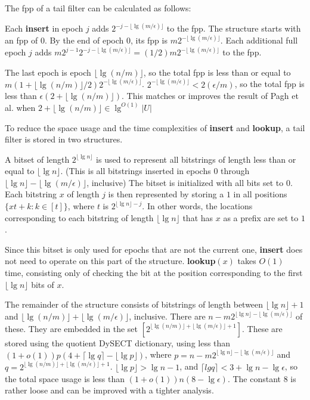 \documentclass[letterpaper]{article}
\begin{document}
The fpp of a tail filter can be calculated as follows:

Each {\bf insert} in epoch $j$ adds $2^{-j - \lfloor \lg (m / \epsilon) \rfloor}$ to the fpp.
The structure starts with an fpp of $0$.
By the end of epoch $0$, its fpp is $m2^{- \lfloor \lg (m / \epsilon) \rfloor}$. %
Each additional full epoch $j$ adds $m 2^{j-1} 2^{-j - \lfloor \lg (m / \epsilon) \rfloor} = (1/2) m 2^{- \lfloor \lg (m / \epsilon) \rfloor}$ to the fpp.

The last epoch is epoch $\lfloor \lg (n/m) \rfloor$, so the total fpp is less than or equal to $m (1 + \lfloor \lg (n/m) \rfloor / 2) 2^{- \lfloor \lg (m / \epsilon) \rfloor}$.
$2^{- \lfloor \lg (m / \epsilon) \rfloor} < 2 (\epsilon / m)$, so the total fpp is less than $\epsilon (2 + \lfloor \lg (n/m) \rfloor)$.
This matches or improves the result of Pagh et al. when $2 + \lfloor \lg (n/m) \rfloor \in \lg^{O(1)} |U|$

To reduce the space usage and the time complexities of {\bf insert} and {\bf lookup}, a tail filter is stored in two structures.

A bitset of length $2^{\lfloor \lg n \rfloor}$ is used to represent all bitstrings of length less than or equal to $\lfloor \lg n \rfloor$.
(This is all bitstrings inserted in epochs $0$ through $\lfloor \lg n \rfloor - \lfloor \lg (m / \epsilon) \rfloor$, inclusive)
The bitset is initialized with all bits set to $0$.
Each bitstring $x$ of length $j$ is then represented by storing a $1$ in all positions $\{x t + k : k \in [t]\}$, where $t$ is  $2^{\lfloor \lg n \rfloor - j}$.
In other words, the locations corresponding to each bitstring of length $\lfloor \lg n \rfloor$ that has $x$ as a prefix are set to $1$.

Since this bitset is only used for epochs that are not the current one, {\bf insert} does not need to operate on this part of the structure.
{\bf lookup$(x)$} takes $O(1)$ time, consisting only of checking the bit at the position corresponding to the first $\lfloor \lg n \rfloor$ bits of $x$.


The remainder of the structure consists of bitstrings of length between $\lfloor \lg n \rfloor + 1$ and $\lfloor \lg(n/m) \rfloor + \lfloor \lg (m / \epsilon) \rfloor$, inclusive.
There are $n - m  2^{\lfloor \lg n \rfloor - \lfloor \lg (m / \epsilon) \rfloor}$ of these.
They are embedded in the set $[2^{\lfloor \lg(n/m) \rfloor + \lfloor \lg (m / \epsilon) \rfloor + 1}]$.
These are stored using the quotient DySECT dictionary, using less than $(1 + o(1)) p (4 + \lceil \lg q \rceil - \lfloor \lg p \rfloor)$, where $p = n - m  2^{\lfloor \lg n \rfloor - \lfloor \lg (m / \epsilon) \rfloor}$ and $q = 2^{\lfloor \lg(n/m) \rfloor + \lfloor \lg (m / \epsilon) \rfloor + 1}$.
$\lfloor \lg p \rfloor > \lg n - 1$, and $\lceil lg q \rceil < 3 + \lg n - \lg \epsilon$, so the total space usage is less than $(1 + o(1)) n (8 - \lg \epsilon)$.
The constant $8$ is rather loose and can be improved with a tighter analysis.
\end{document}

